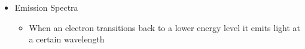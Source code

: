 \begin{itemize}
\begin{itemize}
      \item Emission Spectra

        \begin{itemize}

          \item When an electron transitions back to a lower energy level it emits light at a certain wavelength

        \end{itemize}

    \end{itemize}

\end{itemize}



